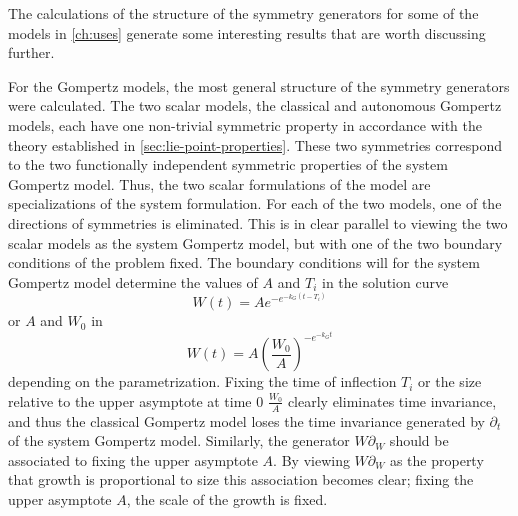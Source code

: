 The calculations of the structure of the symmetry generators for some of the models in \cref{ch:uses} generate some interesting results that are worth discussing further.

For the Gompertz models, the most general structure of the symmetry generators were calculated.
The two scalar models, the classical and autonomous Gompertz models, each have one non-trivial symmetric property in accordance with the theory established in \cref{sec:lie-point-properties}.
These two symmetries correspond to the two functionally independent symmetric properties of the system Gompertz model.
Thus, the two scalar formulations of the model are specializations of the system formulation.
For each of the two models, one of the directions of symmetries is eliminated.
This is in clear parallel to viewing the two scalar models as the system Gompertz model, but with one of the two boundary conditions of the problem fixed.
The boundary conditions will for the system Gompertz model determine the values of \(A\) and \(T_i\) in the solution curve
\begin{equation*}
  W(t) = A e^{-e^{-k_G(t-T_i)}}
\end{equation*}
or \(A\) and \(W_0\) in
\begin{equation*}
  W(t) = A \left(\frac{W_0}{A}\right)^{-e^{-k_G t}}
\end{equation*}
depending on the parametrization.
Fixing the time of inflection \(T_i\) or the size relative to the upper asymptote at time 0 \(\frac{W_0}{A}\) clearly eliminates time invariance, and thus the classical Gompertz model loses the time invariance generated by \(\partial_t\) of the system Gompertz model.
Similarly, the generator \(W \partial_W\) should be associated to fixing the upper asymptote \(A\).
By viewing \(W \partial_W\) as the property that growth is proportional to size this association becomes clear; fixing the upper asymptote \(A\), the scale of the growth is fixed.

